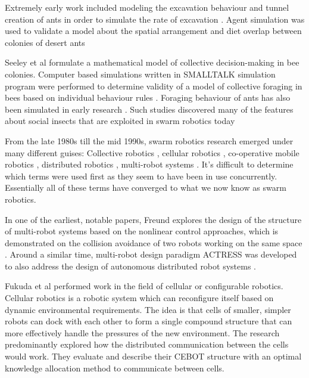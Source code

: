 Extremely early work included modeling the excavation behaviour and tunnel creation of ants in order to simulate the rate of excavation \cite{sudd1975model}. Agent simulation was used to validate a model about the spatial arrangement and diet overlap between colonies of desert ants \cite{ryti1984spatial} 

Seeley et al \cite{seeley1991collective} formulate a mathematical model of collective decision-making in bee colonies. Computer based simulations written in SMALLTALK simulation program were performed to determine validity of a model of collective foraging in bees based on individual behaviour rules \cite{de1998modelling}. Foraging behaviour of ants has also been simulated in early research \cite{lopez1987optimal}. Such studies discovered many of the features about social insects that are exploited in swarm robotics today


From the late 1980s till the mid 1990s, swarm robotics research emerged under many different guises: Collective robotics \cite{kube1993collective}, cellular robotics \cite{freund1984design}, co-operative mobile robotics \cite{cao1997cooperative}, distributed robotics \cite{asama2013distributed}, multi-robot systems \cite{mataric1995cooperative}. It's difficult to determine which terms were used first as they seem to have been in use concurrently. Essentially all of these terms have converged to what we now know as swarm robotics.

In one of the earliest, notable papers, Freund explores the design of the structure of multi-robot systems based on the nonlinear control approaches, which is demonstrated on the collision avoidance of two robots working on the same space \cite{freund1984design,freund1986pathfinding}.
Around a similar time, multi-robot design paradigm ACTRESS was developed to also address the design of autonomous distributed robot systems \cite{asama1989desig}. 

Fukuda et al \cite{fukuda1989communication,fukuda1990analysis} performed work in the field of cellular or configurable robotics. Cellular robotics is a robotic system which can reconfigure itself based on dynamic environmental requirements. The idea is that cells of smaller, simpler robots can dock with each other to form a single compound structure that can more effectively handle the pressures of the new environment. The research predominantly explored how the distributed communication between the cells would work. They evaluate and describe their CEBOT structure with an optimal knowledge allocation method to communicate between cells. 

